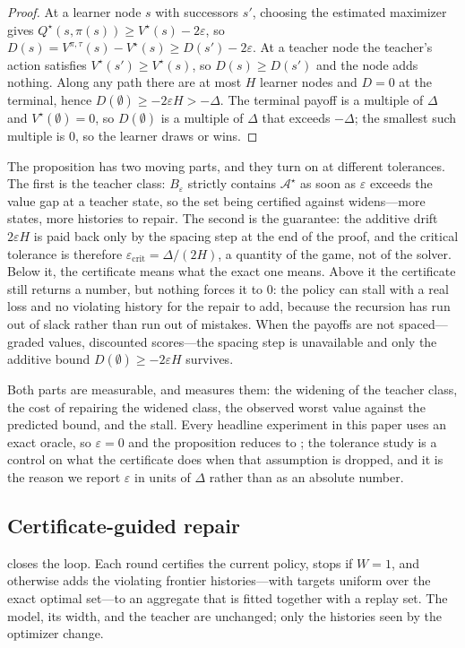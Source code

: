 \documentclass[conference]{IEEEtran}
\begin{document}
\begin{proof}
At a learner node $s$ with successors $s'$, choosing the estimated maximizer gives $Q^{\star}(s,\pi(s))\ge V^{\star}(s)-2\varepsilon$, so $D(s)=V^{\pi,\tau}(s)-V^{\star}(s)\ge D(s')-2\varepsilon$. At a teacher node the teacher's action satisfies $V^{\star}(s')\ge V^{\star}(s)$, so $D(s)\ge D(s')$ and the node adds nothing. Along any path there are at most $H$ learner nodes and $D=0$ at the terminal, hence $D(\emptyset)\ge-2\varepsilon H>-\Delta$. The terminal payoff is a multiple of $\Delta$ and $V^{\star}(\emptyset)=0$, so $D(\emptyset)$ is a multiple of $\Delta$ that exceeds $-\Delta$; the smallest such multiple is $0$, so the learner draws or wins.
\end{proof}

The proposition has two moving parts, and they turn on at different tolerances. The first is the teacher class: $B_\varepsilon$ strictly contains $\mathcal{A}^{\star}$ as soon as $\varepsilon$ exceeds the value gap at a teacher state, so the set being certified against widens---more states, more histories to repair. The second is the guarantee: the additive drift $2\varepsilon H$ is paid back only by the spacing step at the end of the proof, and the critical tolerance is therefore $\varepsilon_{\mathrm{crit}}=\Delta/(2H)$, a quantity of the game, not of the solver. Below it, the certificate means what the exact one means. Above it the certificate still returns a number, but nothing forces it to $0$: the policy can stall with a real loss and no violating history for the repair to add, because the recursion has run out of slack rather than run out of mistakes. When the payoffs are not spaced---graded values, discounted scores---the spacing step is unavailable and only the additive bound $D(\emptyset)\ge-2\varepsilon H$ survives.

Both parts are measurable, and  measures them: the widening of the teacher class, the cost of repairing the widened class, the observed worst value against the predicted bound, and the stall. Every headline experiment in this paper uses an exact oracle, so $\varepsilon=0$ and the proposition reduces to ; the tolerance study is a control on what the certificate does when that assumption is dropped, and it is the reason we report $\varepsilon$ in units of $\Delta$ rather than as an absolute number.

\subsection{Certificate-guided repair}
 closes the loop. Each round certifies the current policy, stops if $W=1$, and otherwise adds the violating frontier histories---with targets uniform over the exact optimal set---to an aggregate that is fitted together with a replay set. The model, its width, and the teacher are unchanged; only the histories seen by the optimizer change.
\end{document}
